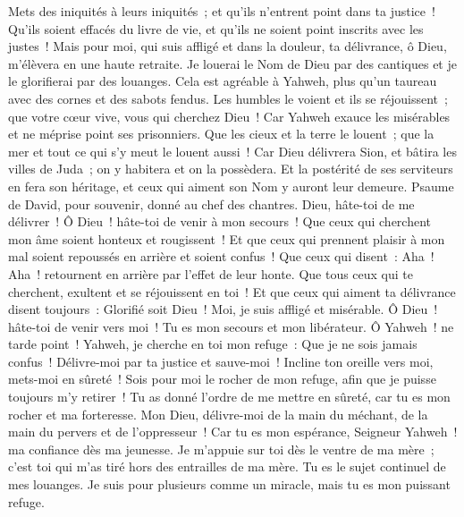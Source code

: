 \begin{multicols}{2}
Mets des iniquités à leurs iniquités~; et qu'ils n'entrent point dans ta justice~!
Qu'ils soient effacés du livre de vie, et qu'ils ne soient point inscrits avec les justes~!
Mais pour moi, qui suis affligé et dans la douleur, ta délivrance, ô Dieu, m'élèvera en une haute retraite.
Je louerai le Nom de Dieu par des cantiques et je le glorifierai par des louanges.
Cela est agréable à Yahweh, plus qu'un taureau avec des cornes et des sabots fendus.
Les humbles le voient et ils se réjouissent~; que votre cœur vive, vous qui cherchez Dieu~!
Car Yahweh exauce les misérables et ne méprise point ses prisonniers.
Que les cieux et la terre le louent~; que la mer et tout ce qui s'y meut le louent aussi~!
Car Dieu délivrera Sion, et bâtira les villes de Juda~; on y habitera et on la possèdera.
Et la postérité de ses serviteurs en fera son héritage, et ceux qui aiment son Nom y auront leur demeure.
\VerseOne{}Psaume de David, pour souvenir, donné au chef des chantres.
Dieu, hâte-toi de me délivrer~! Ô Dieu~! hâte-toi de venir à mon secours~!
Que ceux qui cherchent mon âme soient honteux et rougissent~! Et que ceux qui prennent plaisir à mon mal soient repoussés en arrière et soient confus~!
Que ceux qui disent~: Aha~! Aha~! retournent en arrière par l'effet de leur honte.
Que tous ceux qui te cherchent, exultent et se réjouissent en toi~! Et que ceux qui aiment ta délivrance disent toujours~: Glorifié soit Dieu~!
Moi, je suis affligé et misérable. Ô Dieu~! hâte-toi de venir vers moi~! Tu es mon secours et mon libérateur. Ô Yahweh~! ne tarde point~!
\VerseOne{}Yahweh, je cherche en toi mon refuge~: Que je ne sois jamais confus~!
Délivre-moi par ta justice et sauve-moi~! Incline ton oreille vers moi, mets-moi en sûreté~!
Sois pour moi le rocher de mon refuge, afin que je puisse toujours m'y retirer~! Tu as donné l'ordre de me mettre en sûreté, car tu es mon rocher et ma forteresse.
Mon Dieu, délivre-moi de la main du méchant, de la main du pervers et de l'oppresseur~!
Car tu es mon espérance, Seigneur Yahweh~! ma confiance dès ma jeunesse.
Je m'appuie sur toi dès le ventre de ma mère~; c'est toi qui m'as tiré hors des entrailles de ma mère. Tu es le sujet continuel de mes louanges.
Je suis pour plusieurs comme un miracle, mais tu es mon puissant refuge.

\end{multicols}
